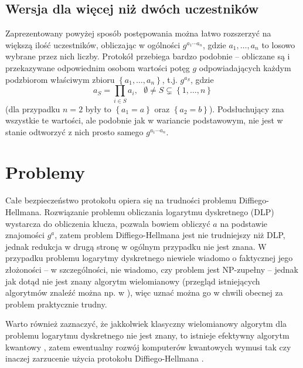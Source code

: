 \documentclass[10pt]{article}
\begin{document}
\subsection{Wersja dla więcej niż dwóch uczestników}

Zaprezentowany powyżej sposób postępowania można łatwo rozszerzyć na większą ilość uczestników,
obliczając w ogólności \(g^{a_1 \cdots a_n}\), gdzie \(a_1,\ldots,a_n\) to losowo wybrane przez nich
liczby. Protokół przebiega bardzo podobnie -- obliczane są i przekazywane odpowiednim osobom
wartości potęg \(g\) odpowiadających każdym podzbiorom właściwym zbioru 
\(\left\{a_1,\ldots,a_n\right\}\), t.j. \(g^{a_S}\), gdzie
\[
a_S = \prod_{i\in S}a_i,\ \ \ 
\emptyset\neq S\varsubsetneq \left\{1,\ldots,n\right\}
\]
(dla przypadku \(n=2\) były to \(\left\{a_1=a\right\}\) oraz
\(\left\{a_2=b\right\}\)). Podsłuchujący zna wszystkie te wartości, ale podobnie jak w wariancie
podstawowym, nie jest w stanie odtworzyć z nich prosto samego \(g^{a_1 \cdots a_n}\).

\section{Problemy}

Całe bezpieczeństwo protokołu opiera się na trudności problemu Diffiego-Hellmana. Rozwiązanie 
problemu obliczania logarytmu dyskretnego (DLP) wystarcza do obliczenia klucza, pozwala 
bowiem obliczyć \(a\) na podstawie znajomości \(g^a\), zatem problem Diffiego-Hellmana jest nie 
trudniejszy niż DLP, jednak redukcja w drugą stronę w ogólnym przypadku nie jest znana\footnotemark.
W przypadku problemu logarytmy dyskretnego niewiele wiadomo o faktycznej jego złożoności -- w
szczególności, nie wiadomo, czy problem jest NP-zupełny -- jednak jak dotąd nie jest znany algorytm
wielomianowy (przegląd istniejących algorytmów znaleźć można np. w \cite{Sutherland07}), więc uznać
można go w chwili obecnej za problem praktycznie trudny.


Warto również zaznaczyć, że jakkolwiek klasyczny wielomianowy algorytm dla problemu logarytmu 
dyskretnego nie jest znany, to istnieje efektywny algorytm kwantowy \cite{Shor97}, zatem ewentualny 
rozwój komputerów kwantowych wymusi tak czy inaczej zarzucenie użycia protokołu Diffiego-Hellmana
\footnotemark.
\end{document}
